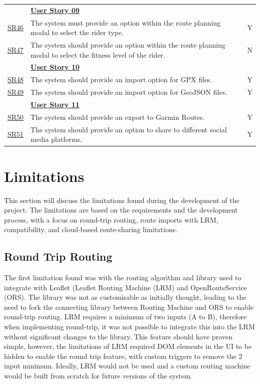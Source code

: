 \begin{table}[!htb]
\begin{tabularx}{\textwidth}{ p{1cm} p{11cm} p{1cm} }
        \hline
        & \textbf{\hyperref[tab:user-story-09]{User Story 09}}  \\
        \hyperref[SR:46]{SR46} & The system must provide an option within the route planning modal to select the rider type. & Y\\
        \hyperref[SR:47]{SR47} & The system should provide an option within the route planning modal to select the fitness level of the rider. & N\\
        \hline
        & \textbf{\hyperref[tab:user-story-10]{User Story 10}}  \\
        \hyperref[SR:48]{SR48} & The system should provide an import option for GPX files. & Y\\
        \hyperref[SR:49]{SR49} & The system should provide an import option for GeoJSON files. & Y\\
        \hline
        & \textbf{\hyperref[tab:user-story-11]{User Story 11}} \\
        \hyperref[SR:50]{SR50} & The system should provide an export to Garmin Routes. & Y\\
        \hyperref[SR:51]{SR51} & The system should provide an option to share to different social media platforms. & Y\\
        \hline
    \end{tabularx}
\end{table}
\endgroup

\clearpage
\section{Limitations}
\label{evaluation:limitations}

This section will discuss the limitations found during the development of the project. The limitations are based on the requirements and the development process, with a focus on round-trip routing, route imports with LRM, compatibility, and cloud-based route-sharing limitations.

\subsection{Round Trip Routing}
The first limitation found was with the routing algorithm and library used to integrate with Leaflet (Leaflet Routing Machine (LRM) and OpenRouteService (ORS). The library was not as customisable as initially thought, leading to the need to fork the connecting library between Routing Machine and ORS to enable round-trip routing. LRM requires a minimum of two inputs (A to B), therefore when implementing round-trip, it was not possible to integrate this into the LRM without significant changes to the library. This feature should have proven simple, however, the limitations of LRM required DOM elements in the UI to be hidden to enable the round trip feature, with custom triggers to remove the 2 input minimum. Ideally, LRM would not be used and a custom routing machine would be built from scratch for future versions of the system.

